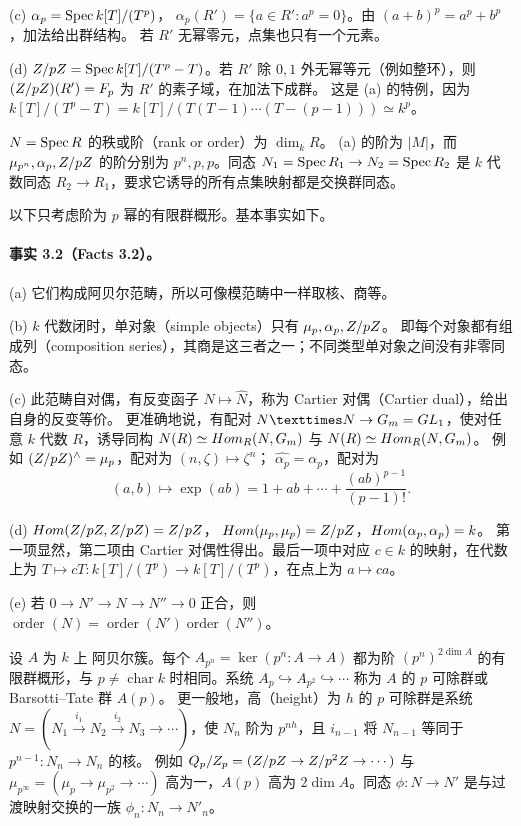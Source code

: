 (c) $\alpha_p=\operatorname{Spec} k[T]/(T^p)$，
$\alpha_p(R')=\{a\in R':a^p=0\}$。由 $(a+b)^p=a^p+b^p$，加法给出群结构。
若 $R'$ 无幂零元，点集也只有一个元素。

(d) $Z/pZ=\operatorname{Spec} k[T]/(T^p-T)$。若 $R'$ 除 $0,1$ 外无幂等元（例如整环），则
$(Z/pZ)(R')=F_p$ 为 $R'$ 的素子域，在加法下成群。
这是 (a) 的特例，因为
$k[T]/(T^p-T)=k[T]/(T(T-1)\cdots(T-(p-1)))\simeq k^p$。

$N=\operatorname{Spec} R$ 的秩或阶（rank or order）为 $\dim_kR$。
(a) 的阶为 $|M|$，而 $\mu_{p^n},\alpha_p,Z/pZ$ 的阶分别为
$p^n,p,p$。同态 $N_1=\operatorname{Spec} R_1\to N_2=\operatorname{Spec} R_2$ 是
$k$ 代数同态 $R_2\to R_1$，要求它诱导的所有点集映射都是交换群同态。

以下只考虑阶为 $p$ 幂的有限群概形。基本事实如下。

\paragraph*{事实 3.2（Facts 3.2）。}
(a) 它们构成阿贝尔范畴，所以可像模范畴中一样取核、商等。

(b) $k$ 代数闭时，单对象（simple objects）只有 $\mu_p,\alpha_p,Z/pZ$。
即每个对象都有组成列（composition series），其商是这三者之一；不同类型单对象之间没有非零同态。

(c) 此范畴自对偶，有反变函子 $N\mapsto\widehat N$，称为 Cartier 对偶（Cartier dual），给出自身的反变等价。
更准确地说，有配对 $N\times\widehat N\to\Gm=\GL_1$，使对任意
$k$ 代数 $R$，诱导同构
$N(R)\simeq Hom_R(N,G_{m})$ 与
$N(R)\simeq Hom_R(N,G_{m})$。
例如 $(Z/pZ)^\wedge=\mu_p$，配对为 $(n,\zeta)\mapsto\zeta^n$；
$\widehat{\alpha_p}=\alpha_p$，配对为
\[
(a,b)\longmapsto\exp(ab)=1+ab+\cdots+\frac{(ab)^{p-1}}{(p-1)!}.
\]

(d) $Hom(Z/pZ,Z/pZ)=Z/pZ$，
$Hom(\mu_p,\mu_p)=Z/pZ$，$Hom(\alpha_p,\alpha_p)=k$。
第一项显然，第二项由 Cartier 对偶性得出。最后一项中对应 $c\in k$ 的映射，在代数上为
$T\mapsto cT:k[T]/(T^p)\to k[T]/(T^p)$，在点上为 $a\mapsto ca$。

(e) 若 $0\to N'\to N\to N''\to0$ 正合，则
$\operatorname{order}(N)=\operatorname{order}(N')\operatorname{order}(N'')$。

设 $A$ 为 $k$ 上 阿贝尔簇。每个
$A_{p^n}=\ker(p^n:A\to A)$ 都为阶 $(p^n)^{2\dim A}$ 的有限群概形，与
$p\ne\operatorname{char}k$ 时相同。系统
$A_p\hookrightarrow A_{p^2}\hookrightarrow\cdots$ 称为
$A$ 的 $p$ 可除群或 Barsotti--Tate 群 $A(p)$。
更一般地，高（height）为 $h$ 的 $p$ 可除群是系统
$N=(N_1\xrightarrow{i_1}N_2\xrightarrow{i_2}N_3\to\cdots)$，使
$N_n$ 阶为 $p^{nh}$，且 $i_{n-1}$ 将 $N_{n-1}$ 等同于
$p^{n-1}:N_n\to N_n$ 的核。
例如 $Q_p/Z_p=(Z/pZ\to Z/p^2Z\to\cdots)$ 与
$\mu_{p^\infty}=(\mu_p\to\mu_{p^2}\to\cdots)$ 高为一，$A(p)$ 高为
$2\dim A$。同态 $\phi:N\to N'$ 是与过渡映射交换的一族
$\phi_n:N_n\to N'_n$。

